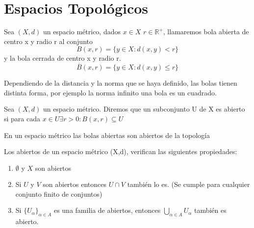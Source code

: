 \chapter{Espacios Topológicos}
\begin{defi}
Sea $(X,d)$ un espacio métrico, dados $x\in X$ $r\in \mathbb{R}^+$, llamaremos bola abierta de centro x y radio r al conjunto 
$$
B(x,r)=\lbrace y\in X \colon d(x,y)<r\rbrace
$$
y la bola cerrada de centro x y radio r.
$$
\overline{B}(x,r)=\lbrace y\in X \colon d(x,y)\leq r\rbrace
$$
\end{defi}

Dependiendo de la distancia y la norma que se haya definido, las bolas tienen distinta forma, por ejemplo la norma infinito una bola es un cuadrado. 

\begin{defi}
Sea $(X,d)$ un espacio métrico. Diremos que un subconjunto U de X es abierto si para cada $x\in U \exists r>0\colon B(x,r)\subseteq U$
\end{defi}
En un espacio métrico las bolas abiertas son abiertos de la topología 

\begin{proposition}
Los abiertos de un espacio métrico (X,d), verifican las siguientes propiedades: 
\begin{enumerate}
\item $\emptyset$ y $X$ son abiertos
\item Si $U$ y  $V$ son abiertos entonces $U \cap V$ también lo es. (Se cumple para cualquier conjunto finito de conjuntos)
\item Si $\lbrace U_\alpha \rbrace_{\alpha\in A}$ es una familia de abiertos, entonces $\bigcup_{\alpha\in A} U_\alpha$ también es abierto. 
\end{enumerate}
\end{proposition}
